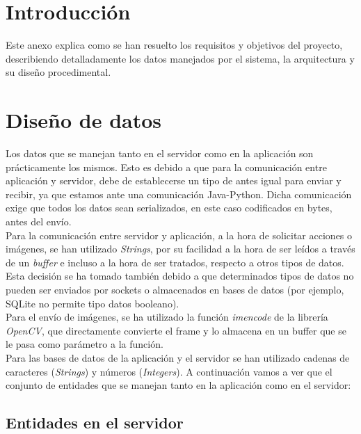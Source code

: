 
\section{Introducción}

Este anexo explica como se han resuelto los requisitos y objetivos del proyecto, describiendo detalladamente los datos manejados por el sistema, la arquitectura y su diseño procedimental.

\section{Diseño de datos}

Los datos que se manejan tanto en el servidor como en la aplicación son prácticamente los mismos.
Esto es debido a que para la comunicación entre aplicación y servidor, debe de establecerse un tipo de antes igual para enviar y recibir, ya que estamos ante una comunicación Java-Python. 
Dicha comunicación exige que todos los datos sean serializados, en este caso codificados en bytes, antes del envío.\\

Para la comunicación entre servidor y aplicación, a la hora de solicitar acciones o imágenes, se han utilizado \textit{Strings}, por su facilidad a la hora de ser leídos a través de un \textit{buffer} e incluso a la hora de ser tratados, respecto a otros tipos de datos.
Esta decisión se ha tomado también debido a que determinados tipos de datos no pueden ser enviados por sockets o almacenados en bases de datos (por ejemplo, SQLite no permite tipo datos booleano).\\

Para el envío de imágenes, se ha utilizado la función \textit{imencode} de la librería \textit{OpenCV}, que directamente convierte el frame y lo almacena en un buffer que se le pasa como parámetro a la función.\\

Para las bases de datos de la aplicación y el servidor se han utilizado cadenas de caracteres (\textit{Strings}) y números (\textit{Integers}). A continuación vamos a ver que el conjunto de entidades que se manejan tanto en la aplicación como en el servidor:

\subsection{Entidades en el servidor}

